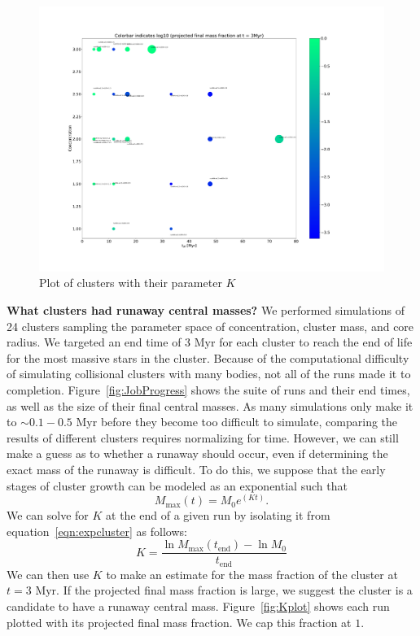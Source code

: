\documentclass[preprint1]{aastex}
\newcommand\Myr{\mbox{ Myr}}
\numberwithin{equation}{section}
\begin{document}
\begin{figure}
    \includegraphics[width=20cm]{kplot}
    \caption{Plot of clusters with their parameter $K$}
    \label{fig:KPlot}
\end{figure}
\textbf{What clusters had runaway central masses?}
We performed simulations of 24 clusters sampling the parameter space of concentration, cluster mass, and core radius. We targeted an end time of $3 \Myr$ for each cluster to reach the end of life for the most massive stars in the cluster. Because of the computational difficulty of simulating collisional clusters with many bodies, not all of the runs made it to completion. Figure~\ref{fig:JobProgress} shows the suite of runs and their end times, as well as the size of their final central masses. As many simulations only make it to $\sim 0.1 - 0.5 \Myr$ before they become too difficult to simulate, comparing the results of different clusters requires normalizing for time.  However, we can still make a guess as to whether a runaway should occur, even if determining the exact mass of the runaway is difficult. To do this, we suppose that the early stages of cluster growth can be modeled as an exponential such that
\begin{equation}
    M_{\mathrm{max}}(t) = M_{0} e^{(Kt)}.
    \label{eqn:expcluster}
\end{equation}
We can solve for $K$ at the end of a given run by isolating it from equation~\ref{eqn:expcluster} as follows:
\begin{equation}
K = \frac{\ln M_{\mathrm{max}}(t_{\mathrm{end}}) - \ln M_{0}}{t_{\mathrm{end}}}
\end{equation}
We can then use $K$ to make an estimate for the mass fraction of the cluster at $t = 3 \Myr$.  If the projected final mass fraction is large, we suggest the cluster is a candidate to have a runaway central mass. Figure~\ref{fig:Kplot} shows each run plotted with its projected final mass fraction.  We cap this fraction at $1$.
\end{document}
